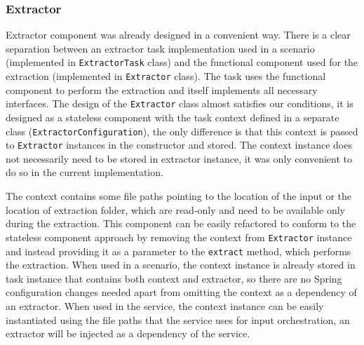 \subsubsection{Extractor}
Extractor component was already designed in a convenient way. There is a clear separation between an extractor task implementation used in a scenario (implemented in \texttt{ExtractorTask} class) and the functional component used for the extraction (implemented in \texttt{Extractor} class). The task uses the functional component to perform the extraction and itself implements all necessary interfaces. The design of the \texttt{Extractor} class almost satisfies our conditions, it is designed as a stateless component with the task context defined in a separate class (\texttt{ExtractorConfiguration}), the only difference is that this context is passed to \texttt{Extractor} instances in the constructor and stored. The context instance does not necessarily need to be stored in extractor instance, it was only convenient to do so in the current implementation.
\par
The context contains some file paths pointing to the location of the input or the location of extraction folder, which are read-only and need to be available only during the extraction. This component can be easily refactored to conform to the stateless component approach by removing the context from \texttt{Extractor} instance and instead providing it as a parameter to the \texttt{extract} method, which performs the extraction. When used in a scenario, the context instance is already stored in task instance that contains both context and extractor, so there are no Spring configuration changes needed apart from omitting the context as a dependency of an extractor. When used in the service, the context instance can be easily instantiated using the file paths that the service uses for input orchestration, an extractor will be injected as a dependency of the service.

